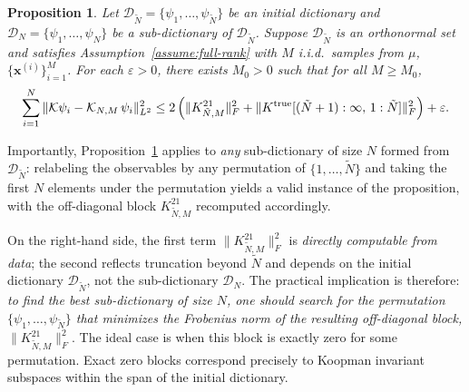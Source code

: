 \documentclass{article}
\theoremstyle{plain}
\newtheorem{proposition}[theorem]{Proposition}
\theoremstyle{definition}
\newcommand{\norm}[1]{\| #1 \|}
\def\x{\mathbf{x}}
\def\Koop{\mathcal{K}}
\def\Dc{\mathcal{D}}
\newcommand{\arXivtag}[1][]{#1}
\begin{document}
	
	\begin{proposition}\label{prop:error-block}
		Let $\Dc_{\tilde N} =\{\psi_1, \dots , \psi_{\tilde N}\}$ be an initial dictionary and $\Dc_N =\{\psi_1, \dots , \psi_N\}$ be a sub-dictionary of $\Dc_{\tilde N}$. Suppose $\Dc_{\tilde{N}}$ is an orthonormal set and satisfies Assumption~\ref{assume:full-rank} with $M$ i.i.d.\ samples from $\mu$, $\{\x^{(i)}\}_{i=1}^M$.
		For each $\varepsilon > 0$, there exists $M_0 > 0$ such that for all $M \geq M_0$,
		\begin{equation}\label{eq:error-block-bound}
			\sum_{i=1}^N \norm{\Koop \psi_i - \Koop_{N,M}\,\psi_i}_{L^2}^2
			\leq
			2\left( \norm{ K_{\tilde{N},M}^{21} }_F^2 + \norm{ K^{\textnormal{\arXivtag[true]}}[(\tilde{N}+1):\infty,\, 1:\tilde{N}] }_F^2 \right) + \varepsilon.
		\end{equation}
	\end{proposition}	
	Importantly, Proposition~\ref{prop:error-block} applies to \emph{any} sub-dictionary of size $N$ formed from $\Dc_{\tilde{N}}$: relabeling the observables by any permutation of $\{1,\ldots,\tilde{N}\}$ and taking the first $N$ elements under the permutation yields a valid instance of the proposition, with the off-diagonal block $K_{\tilde{N},M}^{21}$ recomputed accordingly.
	
	On the right-hand side, the first term $\|K_{\tilde{N},M}^{21}\|_F^2$ is \emph{directly computable from data}; the second reflects truncation beyond $\tilde{N}$ and depends on the initial dictionary $\Dc_{\tilde{N}}$, not the sub-dictionary $\Dc_{N}$.
	The practical implication is therefore: \emph{to find the best sub-dictionary of size $N$, one should search for the permutation $\{\psi_1,\ldots,\psi_{\tilde{N}}\}$ that minimizes the Frobenius norm of the resulting off-diagonal block, $\norm{ K_{\tilde{N},M}^{21} }_F^2$}. The ideal case is when this block is exactly zero for some permutation. Exact zero blocks correspond precisely to Koopman invariant subspaces within the span of the initial dictionary.
	
\end{document}
